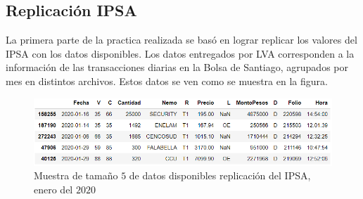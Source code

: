 \documentclass{article}
\begin{document}
\subsection{Replicación IPSA}
   	La primera parte de la practica realizada se basó en lograr replicar los valores del IPSA con los datos disponibles. Los datos entregados por LVA corresponden a la información de las transacciones diarias en la Bolsa de Santiago, agrupados por mes en distintos archivos. Estos datos se ven como se muestra en la figura.
   	\begin{figure}[H]
   		\centering
   		\includegraphics[scale=.5]{imgs/transacciones_RV_data.png}
   		\caption{Muestra de tamaño $5$ de datos disponibles replicación del IPSA, enero 			del $2020$}
   	\end{figure}
    	


 
    
\end{document}
